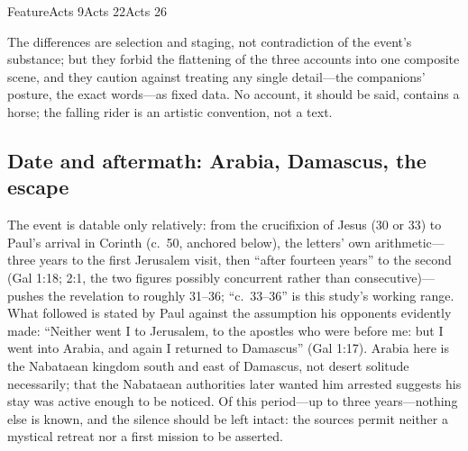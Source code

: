 \begin{fourstable}{Feature}{Acts 9}{Acts 22}{Acts 26}
\end{fourstable}

The differences are selection and staging, not contradiction of the
event's substance; but they forbid the flattening of the three accounts
into one composite scene, and they caution against treating any single
detail---the companions' posture, the exact words---as fixed data. No
account, it should be said, contains a horse; the falling rider is an
artistic convention, not a text.

\subsection{Date and aftermath: Arabia, Damascus, the escape}

The event is datable only relatively: from the crucifixion of Jesus
(30 or 33) to Paul's arrival in Corinth (c.~50, anchored below), the
letters' own arithmetic---three years to the first Jerusalem visit, then
``after fourteen years'' to the second (Gal 1:18; 2:1, the two figures
possibly concurrent rather than consecutive)---pushes the revelation to
roughly 31--36; ``c.~33--36'' is this study's working range. What followed
is stated by Paul against the assumption his opponents evidently made:
``Neither went I to Jerusalem, to the apostles who were before me: but I
went into Arabia, and again I returned to Damascus'' (Gal 1:17). Arabia
here is the Nabataean kingdom south and east of Damascus, not desert
solitude necessarily; that the Nabataean authorities later wanted him
arrested suggests his stay was active enough to be noticed. Of this
period---up to three years---nothing else is known, and the silence should
be left intact: the sources permit neither a mystical retreat nor a first
mission to be asserted.

